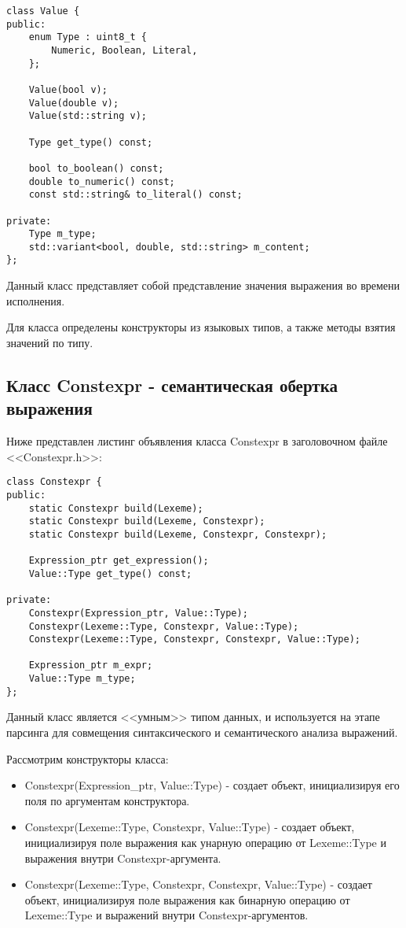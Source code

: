 \begin{verbatim}
class Value {
public:
    enum Type : uint8_t {
        Numeric, Boolean, Literal,
    };

    Value(bool v);
    Value(double v);
    Value(std::string v);

    Type get_type() const;

    bool to_boolean() const;
    double to_numeric() const;
    const std::string& to_literal() const;

private:
    Type m_type;
    std::variant<bool, double, std::string> m_content;
};
\end{verbatim}

Данный класс представляет собой представление
значения выражения во времени исполнения.

Для класса определены конструкторы из языковых типов,
а также методы взятия значений по типу.

\subsection{Класс Constexpr - семантическая обертка выражения}

Ниже представлен листинг объявления класса Constexpr
в заголовочном файле <<Constexpr.h>>:

\begin{verbatim}
class Constexpr {
public:
    static Constexpr build(Lexeme);
    static Constexpr build(Lexeme, Constexpr);
    static Constexpr build(Lexeme, Constexpr, Constexpr);

    Expression_ptr get_expression();
    Value::Type get_type() const;

private:
    Constexpr(Expression_ptr, Value::Type);
    Constexpr(Lexeme::Type, Constexpr, Value::Type);
    Constexpr(Lexeme::Type, Constexpr, Constexpr, Value::Type);

    Expression_ptr m_expr;
    Value::Type m_type;
};
\end{verbatim}

Данный класс является <<умным>> типом данных, и используется
на этапе парсинга для совмещения синтаксического
и семантического анализа выражений.

Рассмотрим конструкторы класса:
\begin{itemize}
    \item Constexpr(Expression\_ptr, Value::Type) - создает
          объект, инициализируя его поля по аргументам
          конструктора.
          
    \item Constexpr(Lexeme::Type, Constexpr, Value::Type) -
          создает объект, инициализируя поле выражения 
          как унарную операцию от Lexeme::Type и выражения 
          внутри Constexpr-аргумента.

    \item Constexpr(Lexeme::Type, Constexpr, Constexpr, Value::Type) -
          создает объект, инициализируя поле выражения
          как бинарную операцию от Lexeme::Type и выражений
          внутри Constexpr-аргументов.
\end{itemize}

